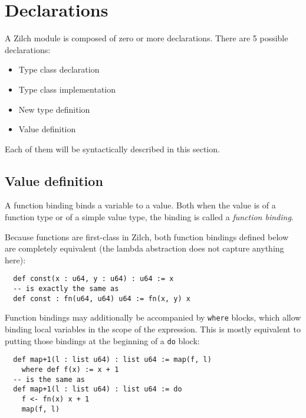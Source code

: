 \section{Declarations}\label{sec:zilch-grammar-declarations}

A Zilch module is composed of zero or more declarations.
There are 5 possible declarations:
\begin{itemize}
  \item Type class declaration
  \item Type class implementation
  \item New type definition
  \item Value definition
\end{itemize}

\noindent Each of them will be syntactically described in this section.

\subsection{Value definition}\label{subsec:zilch-grammar-declarations-value}

A function binding binds a variable to a value.
Both when the value is of a function type or of a simple value type, the binding is called a \textit{function binding}.
\vspace*{\baselineskip}

Because functions are first-class in Zilch, both function bindings defined below are completely equivalent (the lambda abstraction does not capture anything here):

\noindent\begin{verbatim}
  def const(x : u64, y : u64) : u64 := x
  -- is exactly the same as
  def const : fn(u64, u64) u64 := fn(x, y) x
\end{verbatim}
\vspace*{\baselineskip}

Function bindings may additionally be accompanied by \verb|where| blocks, which allow binding local variables in the scope of the expression.
This is mostly equivalent to putting those bindings at the beginning of a \verb|do| block:

\noindent\begin{verbatim}
  def map+1(l : list u64) : list u64 := map(f, l)
    where def f(x) := x + 1
  -- is the same as
  def map+1(l : list u64) : list u64 := do
    f <- fn(x) x + 1
    map(f, l)
\end{verbatim}

